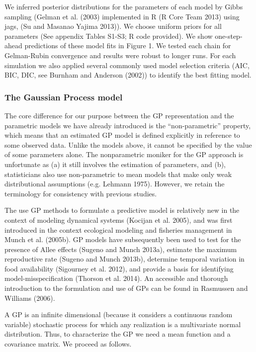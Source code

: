 \documentclass[]{components/elsarticle}
\begin{document}
We inferred posterior distributions for the parameters of each model by
Gibbs sampling (Gelman et al. (2003) implemented in R (R Core Team 2013)
using jags, (Su and Masanao Yajima 2013)). We choose uniform priors for
all parameters (See appendix Tables S1-S3; R code provided). We show
one-step-ahead predictions of these model fits in Figure 1. We tested
each chain for Gelman-Rubin convergence and results were robust to
longer runs. For each simulation we also applied several commonly used
model selection criteria (AIC, BIC, DIC, see Burnham and Anderson
(2002)) to identify the best fitting model.

\subsubsection{The Gaussian Process
model}\label{the-gaussian-process-model}

The core difference for our purpose between the GP representation and
the parametric models we have already introduced is the
``non-parametric'' property, which means that an estimated GP model is
defined explicitly in reference to some observed data. Unlike the models
above, it cannot be specified by the value of some parameters alone. The
nonparametric moniker for the GP approach is unfortunate as (a) it still
involves the estimation of parameters, and (b), statisticians also use
non-parametric to mean models that make only weak distributional
assumptions (e.g. Lehmann 1975). However, we retain the terminology for
consistency with previous studies.

The use GP methods to formulate a predictive model is relatively new in
the context of modeling dynamical systems (Kocijan et al. 2005), and was
first introduced in the context ecological modeling and fisheries
management in Munch et al. (2005b). GP models have subsequently been
used to test for the presence of Allee effects (Sugeno and Munch 2013a),
estimate the maximum reproductive rate (Sugeno and Munch 2013b),
determine temporal variation in food availability (Sigourney et al.
2012), and provide a basis for identifying model-misspecification
(Thorson et al. 2014). An accessible and thorough introduction to the
formulation and use of GPs can be found in Rasmussen and Williams
(2006).

A GP is an infinite dimensional (because it considers a continuous
random variable) stochastic process for which any realization is a
multivariate normal distribution. Thus, to characterize the GP we need a
mean function and a covariance matrix. We proceed as follows.
\end{document}
